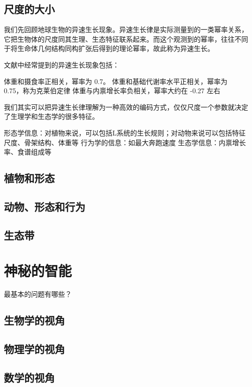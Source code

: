 \documentclass[a4paper,10.5pt]{book}
\begin{document}
\section{尺度的大小}

我们先回顾地球生物的异速生长现象。异速生长律是实际测量到的一类幂率关系，
它把生物体的尺度同其生理、生态特征联系起来。而这个观测到的幂率，往往不同于将生命体几何结构同构扩张后得到的理论幂率，故此称为异速生长。

文献中经常提到的异速生长现象包括：

体重和摄食率正相关，幂率为 0.7。
体重和基础代谢率水平正相关，幂率为 0.75，称为克莱伯定律
体重与内禀增长率负相关，幂率大约在 -0.27 左右

我们其实可以把异速生长律理解为一种高效的编码方式，仅仅尺度一个参数就决定了生理学和生态学的很多特征。

形态学信息：对植物来说，可以包括L系统的生长规则；对动物来说可以包括特征尺度、骨架结构、体重等
行为学的信息：如最大奔跑速度
生态学信息：内禀增长率、食谱组成等

\section{植物和形态}

\section{动物、形态和行为}

\section{生态带}



\chapter{神秘的智能}

最基本的问题有哪些？

\section{生物学的视角}

\section{物理学的视角}

\section{数学的视角}
\end{document}
